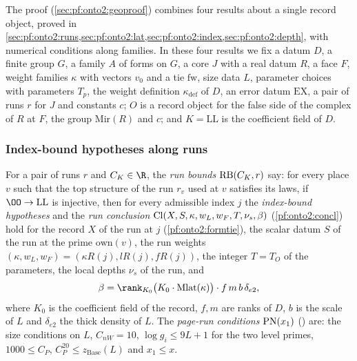 The proof (\cref{sec:pf:onto2:geoproof}) combines four results about a single record object, proved in
\cref{sec:pf:onto2:runs,sec:pf:onto2:lat,sec:pf:onto2:index,sec:pf:onto2:depth}, with numerical conditions along families. In
these four results we fix a datum $D$, a finite group $G$, a family $A$ of forms on $G$, a core $J$ with a real datum $R$, a
face $F$, weight families $\kappa$ with vectors $v_0$ and a tie $\mathrm{fw}$, size data $L$, parameter choices with parameters
$T_p$, the weight definition $\kappa_{\mathrm{def}}$ of $D$, an error datum $\mathrm{EX}$, a pair of runs $r$ for $J$ and
constants $c$; $O$ is a record object for the false side of the complex of $R$ at $F$, the group $\mathrm{Mir}(R)$ and $c$; and
$K=\mathrm{LL}$ is the coefficient field of $D$.

\subsubsection{Index-bound hypotheses along runs}\label{sec:pf:onto2:runs}

\begin{definition}\label{pf:onto2:runbounds}
For a pair of runs $r$ and $C_K\in\R$, the \emph{run bounds} $\mathrm{RB}(C_K,r)$ say: for every place $v$ such that the top
structure of the run $r_v$ used at $v$ satisfies its laws, if $\OO\to\mathrm{LL}$ is injective, then for every
admissible index $j$ the \emph{index-bound hypotheses} and the \emph{run conclusion}
$\mathrm{Cl}(X,S,\kappa,w_L,w_F,T,\nu_s,\beta)$ (\cref{pf:onto2:concl}) hold for the record $X$ of the run at $j$
(\cref{pf:onto2:formtie}), the scalar datum $S$ of the run at the prime $\mathrm{own}(v)$, the run weights
$(\kappa,w_L,w_F)=(\kappa R(j),lR(j),fR(j))$, the integer $T=T_O$ of the parameters, the local depths $\nu_s$ of the run, and
\begin{equation}\label{eq:pf:onto2:beta}
\beta=\rank_{K_0}\bigl(K_0\cdot\mathrm{Mlat}(\kappa)\bigr)\cdot f\,m\,b\,\delta_{e2},
\end{equation}
where $K_0$ is the coefficient field of the record, $f,m$ are ranks of $D$, $b$ is the scale of $L$ and $\delta_{e2}$ the thick
density of $L$. The \emph{page-run conditions} $\mathrm{PN}(x_1)$ () are: the size conditions
on $L$, $C_{nW}=10$, $\log g_i\le 9L+1$ for the two level primes, $1000\le C_P$, $C_P^{20}\le z_{\mathrm{Base}}(L)$ and $x_1\le x$.
\end{definition}

